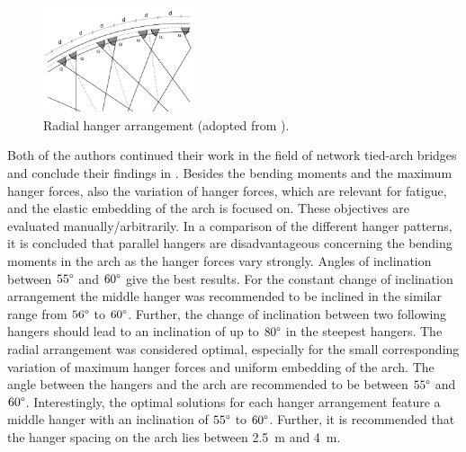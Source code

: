 \begin{figure}[H]
\centering
\includegraphics[width=0.4\textwidth]{Pictures/RadialArrangement.PNG}
\caption{Radial hanger arrangement (adopted from \citep{BrunnSchanack2}).}
\label{fig:Brunn}
\end{figure}

Both of the authors continued their work in the field of network tied-arch bridges and conclude their findings in \citep{BrunnSchanack2}. Besides the bending moments and the maximum hanger forces, also the variation of hanger forces, which are relevant for fatigue, and the elastic embedding of the arch is focused on. These objectives are evaluated manually/arbitrarily. In a comparison of the different hanger patterns, it is concluded that parallel hangers are disadvantageous concerning the bending moments in the arch as the hanger forces vary strongly. Angles of inclination between $55\degree$ and $60\degree$ give the best results. For the constant change of inclination arrangement the middle hanger was recommended to be inclined in the similar range from $56\degree$ to $60\degree$. Further, the change of inclination between two following hangers should lead to an inclination of up to $80\degree$ in the steepest hangers. The radial arrangement was considered optimal, especially for the small corresponding variation of maximum hanger forces and uniform embedding of the arch. The angle between the hangers and the arch are recommended to be between $55\degree$ and $60\degree$. Interestingly, the optimal solutions for each hanger arrangement feature a middle hanger with an inclination of $55\degree$ to $60\degree$. Further, it is recommended that the hanger spacing on the arch lies between \SI{2.5}{m} and \SI{4}{m}.


